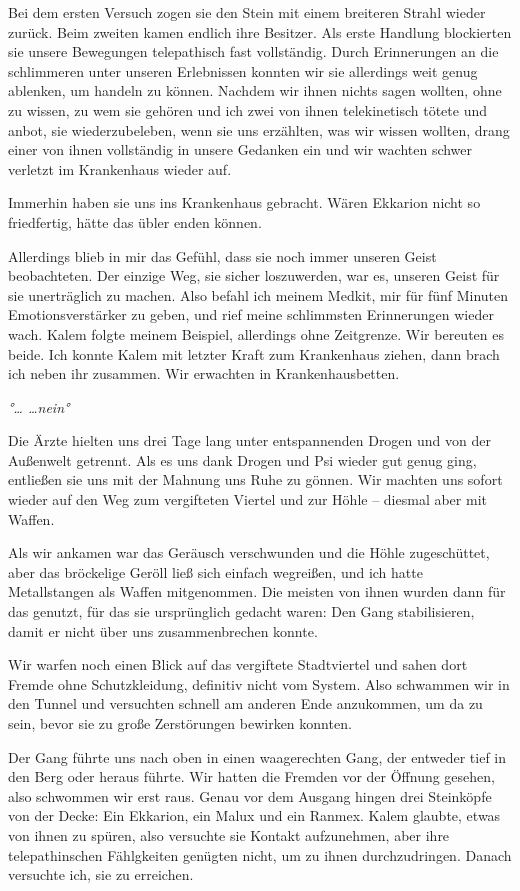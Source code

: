 \documentclass[11pt]{article}
\begin{document}
Bei dem ersten Versuch zogen sie den Stein mit einem breiteren Strahl
wieder zurück. Beim zweiten kamen endlich ihre Besitzer. Als erste
Handlung blockierten sie unsere Bewegungen telepathisch fast
vollständig. Durch Erinnerungen an die schlimmeren unter unseren
Erlebnissen konnten wir sie allerdings weit genug ablenken, um handeln
zu können. Nachdem wir ihnen nichts sagen wollten, ohne zu wissen, zu
wem sie gehören und ich zwei von ihnen telekinetisch tötete und anbot,
sie wiederzubeleben, wenn sie uns erzählten, was wir wissen wollten,
drang einer von ihnen vollständig in unsere Gedanken ein und wir wachten
schwer verletzt im Krankenhaus wieder auf.

Immerhin haben sie uns ins Krankenhaus gebracht. Wären Ekkarion nicht so
friedfertig, hätte das übler enden können.

Allerdings blieb in mir das Gefühl, dass sie noch immer unseren Geist
beobachteten. Der einzige Weg, sie sicher loszuwerden, war es, unseren
Geist für sie unerträglich zu machen. Also befahl ich meinem Medkit, mir
für fünf Minuten Emotionsverstärker zu geben, und rief meine schlimmsten
Erinnerungen wieder wach. Kalem folgte meinem Beispiel, allerdings ohne
Zeitgrenze. Wir bereuten es beide. Ich konnte Kalem mit letzter Kraft
zum Krankenhaus ziehen, dann brach ich neben ihr zusammen. Wir erwachten
in Krankenhausbetten.

\emph{°\ldots{} \ldots{}nein°}

Die Ärzte hielten uns drei Tage lang unter entspannenden Drogen und von
der Außenwelt getrennt. Als es uns dank Drogen und Psi wieder gut genug
ging, entließen sie uns mit der Mahnung uns Ruhe zu gönnen. Wir machten
uns sofort wieder auf den Weg zum vergifteten Viertel und zur Höhle --
diesmal aber mit Waffen.

Als wir ankamen war das Geräusch verschwunden und die Höhle
zugeschüttet, aber das bröckelige Geröll ließ sich einfach wegreißen,
und ich hatte Metallstangen als Waffen mitgenommen. Die meisten von
ihnen wurden dann für das genutzt, für das sie ursprünglich gedacht
waren: Den Gang stabilisieren, damit er nicht über uns zusammenbrechen
konnte.

Wir warfen noch einen Blick auf das vergiftete Stadtviertel und sahen
dort Fremde ohne Schutzkleidung, definitiv nicht vom System. Also
schwammen wir in den Tunnel und versuchten schnell am anderen Ende
anzukommen, um da zu sein, bevor sie zu große Zerstörungen bewirken
konnten.

Der Gang führte uns nach oben in einen waagerechten Gang, der entweder
tief in den Berg oder heraus führte. Wir hatten die Fremden vor der
Öffnung gesehen, also schwommen wir erst raus. Genau vor dem Ausgang
hingen drei Steinköpfe von der Decke: Ein Ekkarion, ein Malux und ein
Ranmex. Kalem glaubte, etwas von ihnen zu spüren, also versuchte sie
Kontakt aufzunehmen, aber ihre telepathinschen Fählgkeiten genügten
nicht, um zu ihnen durchzudringen. Danach versuchte ich, sie zu
erreichen.
\end{document}
